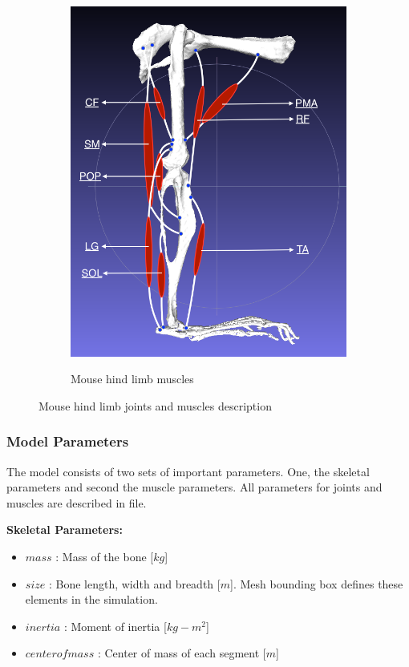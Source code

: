 \documentclass{cmc}
\begin{document}
\begin{figure}[H]
\begin{subfigure}[b]{0.49\textwidth}
{      \includegraphics[width=\textwidth]{figures/HindLimbMuscles.png}
    }
    \caption{Mouse hind limb muscles}
    \label{fig:hind_limb_muscles}
  \end{subfigure}
  \caption{Mouse hind limb joints and muscles description}
  \label{fig:hind_limb_joints_muscles}
\end{figure}

\subsubsection*{Model Parameters}
\label{sec:model-parameters}

The model consists of two sets of important parameters. One, the
skeletal parameters and second the muscle parameters. All parameters
for joints and muscles are described in
 file.

\textbf{Skeletal Parameters:}
\begin{itemize}
\item $mass$ : Mass of the bone [$kg$]
\item $size$ : Bone length, width and breadth [$m$]. Mesh bounding box
  defines these elements in the simulation.
\item $inertia$ : Moment of inertia [$kg-m^2$]
\item $center of mass$ : Center of mass of each segment [$m$]
\end{itemize}
\end{document}
